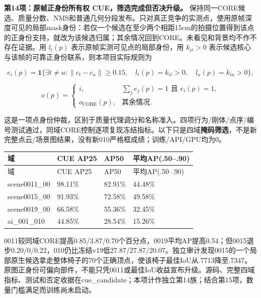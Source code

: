 \documentclass[UTF8,fontset=fandol]{ctexart}
\begin{document}
\textbf{第14项：原帧正身份所有权 CUE，筛选完成但否决升级。} 保持同一CORE候选、质量分数、NMS和普通几何分段发布。只对真正竞争的实测点，使用原帧深度可见的局部mask身份：若仅一个候选在至少两个相距15cm的拍摄位置得到该点的正身份支持，就改为该候选归属；其余情况回到CORE。未看见和背景均不作不存在证据。用 $l_t(p)$ 表示原帧实测可见点的局部身份，用 $k_{it}>0$ 表示候选核心与该帧的可靠正身份联系，则本项目实际规则为



\[
e_i(p)=\mathbf{1}\{\exists t\ne u:\|c_t-c_u\|\ge0.15,\quad l_t(p)=k_{it}>0,\quad l_u(p)=k_{iu}>0\},
\]

\[
o(p)=\begin{cases}i,&\sum_j e_j(p)=1\text{ 且 }e_i(p)=1,\\o_{\mathrm{CORE}}(p),&\text{其余情况}.\end{cases}
\]

这是一项点身份仲裁，区别于质量代理调分和名称准入。四项行为/刚体/点序/编号测试通过，同域CORE控制逐项复现冻结指标。以下只是四域\textbf{掩码筛选}，不是新完整点云/场景图结果，没有新010严格框成绩；训练/API/GPU均为0。



{\small
\begin{longtable}{|p{}|p{}|p{}|p{}|}
\hline
域 & CUE AP25 & AP50 & 平均AP(.50–.90) \\ \hline
\endfirsthead
\hline
域 & CUE AP25 & AP50 & 平均AP(.50–.90) \\ \hline
\endhead
scene0011\_00 & 98.11\% & 82.91\% & 44.48\% \\ \hline
scene0015\_00 & 91.93\% & 72.58\% & 49.58\% \\ \hline
scene0019\_00 & 66.58\% & 55.36\% & 32.45\% \\ \hline
ai\_001\_010 & 44.85\% & 28.54\% & 15.26\% \\ \hline
\end{longtable}
}

0011较同域CORE提高0.85/3.87/0.70个百分点，0019平均AP提高0.54；但0015退步0.20/0/0.22，010仍比冻结v19低27.87/27.87/20.07。独立审计发现0015的一个局部原生候选拿走整体椅子的70个正确顶点，使该椅子最佳IoU从.7713降至.7347。原图正身份可偏向部件，不能只凭0011或最佳IoU收益宣布升级。源码、完整四域指标、测试和否定收据在cue\_candidate；本项计作独立第14族；结合第15项，数量门槛满足而训练尚未启动。
\end{document}
